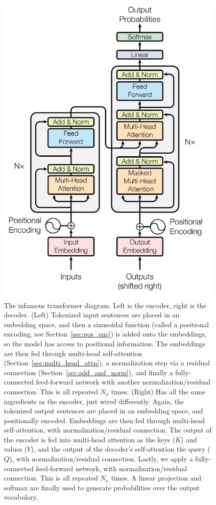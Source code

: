 \documentclass[11pt]{article}
\numberwithin{equation}{section}
\begin{document}
\begin{figure}
\begin{center}
\includegraphics[width=0.4\columnwidth]{../figures/transformer.jpg}  
\end{center}
\caption{The infamous transformer diagram. Left is the encoder, right is the decoder. (Left) Tokenized input sentences are placed in an embedding space, and then a sinusoidal function (called a positional encoding, see Section~\ref{sec:pos_enc}) is added onto the embeddings, so the model has access to positional information. The embeddings are then fed through multi-head self-attention (Section~\ref{sec:multi_head_attn}), a normalization step via a residual connection (Section~\ref{sec:add_and_norm}), and finally a fully-connected feed-forward network with another normalization/residual connection. This is all repeated $N_x$ times. (Right) Has all the same ingredients as the encoder, just wired differently. Again, the tokenized output sentences are placed in an embedding space, and positionally encoded. Embeddings are then fed through multi-head self-attention, with normalization/residual connection. The output of the encoder is fed into multi-head attention as the keys ($K$) and values ($V$), and the output of the decoder's self-attention the query ($Q$), with normalization/residual connection. Lastly, we apply a fully-connected feed-forward network, with normalization/residual connection. This is all repeated $N_x$ times. A linear projection and softmax are finally used to generate probabilities over the output vocabulary.}
\label{fig:tfm}
\end{figure}
\end{document}
